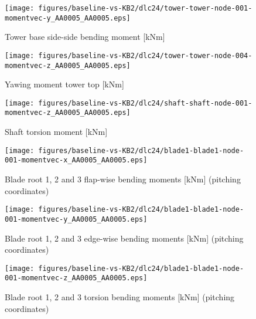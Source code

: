 \begin{figure}[!ht]
\begin{center}
	\texttt{[image: figures/baseline-vs-KB2/dlc24/tower-tower-node-001-momentvec-y\_AA0005\_AA0005.eps]}
\end{center}
\caption{Tower base side-side bending moment [kNm]}
\label{fig:baseline-vs-KB2:dlc24:tower-base-ss}
\end{figure}

\begin{figure}[!ht]
\begin{center}
	\texttt{[image: figures/baseline-vs-KB2/dlc24/tower-tower-node-004-momentvec-z\_AA0005\_AA0005.eps]}
\end{center}
\caption{Yawing moment tower top [kNm]}
\label{fig:baseline-vs-KB2:dlc24:tower-top-yaw}
\end{figure}

\begin{figure}[!ht]
\begin{center}
	\texttt{[image: figures/baseline-vs-KB2/dlc24/shaft-shaft-node-001-momentvec-z\_AA0005\_AA0005.eps]}
\end{center}
\caption{Shaft torsion moment [kNm]}
\label{fig:baseline-vs-KB2:dlc24:shaft-torsion}
\end{figure}

\begin{figure}[!ht]
\begin{center}
	\texttt{[image: figures/baseline-vs-KB2/dlc24/blade1-blade1-node-001-momentvec-x\_AA0005\_AA0005.eps]}
\end{center}
\caption{Blade root 1, 2 and 3 flap-wise bending moments [kNm] (pitching coordinates)}
\label{fig:baseline-vs-KB2:dlc24:blade-root-flap}
\end{figure}

\begin{figure}[!ht]
\begin{center}
	\texttt{[image: figures/baseline-vs-KB2/dlc24/blade1-blade1-node-001-momentvec-y\_AA0005\_AA0005.eps]}
\end{center}
\caption{Blade root 1, 2 and 3 edge-wise bending moments [kNm] (pitching coordinates)}
\label{fig:baseline-vs-KB2:dlc24:blade-root-edge}
\end{figure}

\begin{figure}[!ht]
\begin{center}
	\texttt{[image: figures/baseline-vs-KB2/dlc24/blade1-blade1-node-001-momentvec-z\_AA0005\_AA0005.eps]}
\end{center}
\caption{Blade root 1, 2 and 3 torsion bending moments [kNm] (pitching coordinates)}
\label{fig:baseline-vs-KB2:dlc24:blade-root-torsion}
\end{figure}

